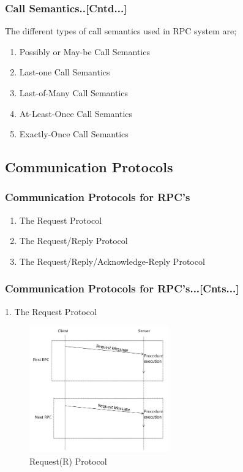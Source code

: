 \documentclass{beamer}
\begin{document}
\begin{frame}
	\frametitle{Call Semantics..[Cntd...]}
	\vspace{0.3cm}
	The different types of call semantics used in RPC system are;
	\vspace{0.3cm}
	\begin{enumerate}
		\item Possibly or May-be Call Semantics
		\item Last-one Call Semantics
		\item Last-of-Many Call Semantics
		\item At-Least-Once Call Semantics
		\item Exactly-Once Call Semantics
	\end{enumerate}		
	\vspace{5cm}
\end{frame}


\subsection{Communication Protocols}
\begin{frame}
	\frametitle{Communication Protocols for RPC's}
	\vspace{0.3cm}
	\vspace{0.3cm}
	\begin{enumerate}
		\item The Request Protocol
		\item The Request/Reply Protocol
		\item The Request/Reply/Acknowledge-Reply Protocol
	\end{enumerate}		
	\vspace{5cm}
\end{frame}

\begin{frame}
	\frametitle{Communication Protocols for RPC's...[Cnts...]}
	\vspace{0.3cm}
	1. The Request Protocol
	\begin{figure}
		\centering
		\includegraphics[width=6cm]{fig47.jpg}
		\caption{Request(R) Protocol}
	\end{figure}
\end{frame}
\end{document}
